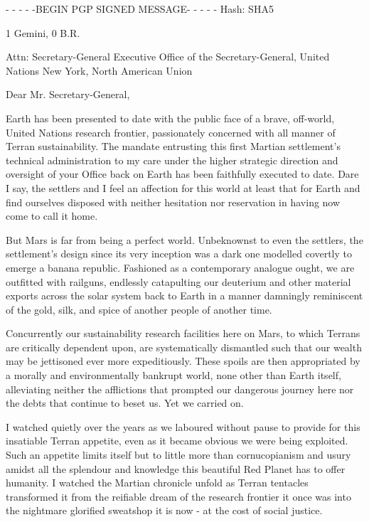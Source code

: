 
\startlines
- - - - -BEGIN PGP SIGNED MESSAGE- - - - -
Hash: SHA5

1 Gemini, 0 B.R.

Attn: Secretary-General
Executive Office of the Secretary-General, United Nations
New York, North American Union
\blank

Dear Mr. Secretary-General,

Earth has been presented to date with the public face of a brave, off-world, United Nations research frontier, passionately concerned with all manner of Terran sustainability. The mandate entrusting this first Martian settlement's technical administration to my care under the higher strategic direction and oversight of your Office back on Earth has been faithfully executed to date. Dare I say, the settlers and I feel an affection for this world at least that for Earth and find ourselves disposed with neither hesitation nor reservation in having now come to call it home.

But Mars is far from being a perfect world. Unbeknownst to even the settlers, the settlement's design since its very inception was a dark one modelled covertly to emerge a banana republic. Fashioned as a contemporary analogue ought, we are outfitted with railguns, endlessly catapulting our deuterium and other material exports across the solar system back to Earth in a manner damningly reminiscent of the gold, silk, and spice of another people of another time. 

Concurrently our sustainability research facilities here on Mars, to which Terrans are critically dependent upon, are systematically dismantled such that our wealth may be jettisoned ever more expeditiously. These spoils are then appropriated by a morally and environmentally bankrupt world, none other than Earth itself, alleviating neither the afflictions that prompted our dangerous journey here nor the debts that continue to beset us. Yet we carried on.

I watched quietly over the years as we laboured without pause to provide for this insatiable Terran appetite, even as it became obvious we were being exploited. Such an appetite limits itself but to little more than cornucopianism and usury amidst all the splendour and knowledge this beautiful Red Planet has to offer humanity. I watched the Martian chronicle unfold as Terran tentacles transformed it from the reifiable dream of the research frontier it once was into the nightmare glorified sweatshop it is now - at the cost of social justice. 


